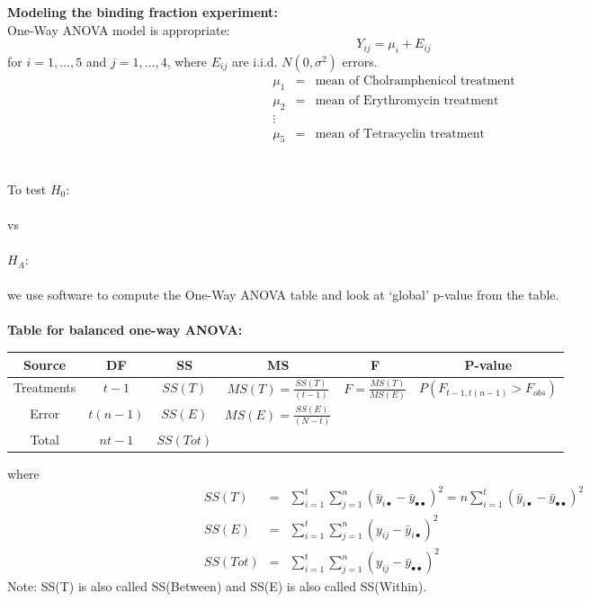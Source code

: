 \textbf{Modeling the binding fraction experiment:}\\
One-Way ANOVA model is appropriate: 
$$Y_{ij} = \mu_i + E_{ij}$$
for $i=1,\ldots,5$ and $j=1,\ldots,4$, where $E_{ij}$ are i.i.d. $N(0,\sigma^2)$ errors.
\begin{eqnarray*}
\mu_1 & = & \mbox{mean of Cholramphenicol treatment}\\
\mu_2 & = & \mbox{mean of Erythromycin treatment}\\
\vdots\\ 
\mu_5 & = & \mbox{mean of Tetracyclin treatment}
\end{eqnarray*}
~\\~\\
To test 
$H_0:$\\~\\ %
vs\\~\\
$H_A:$\\~\\ %
we use software to compute the One-Way ANOVA table and look at `global' p-value from the table.\\~\\
\textbf{Table for balanced one-way ANOVA:}
\begin{center}
\begin{tabular}{|c|c|c|c|c|c|} \hline
Source & DF & SS & MS & F & P-value\\ \hline
Treatments & $t-1$ & $SS(T)$ & $MS(T)=\frac{SS(T)}{(t-1)}$ & $F=\frac{MS(T)}{MS(E)}$ & $P(F_{t-1,t(n-1)}>F_{obs})$\\ 
Error & $t(n-1)$ & $SS(E)$ & $MS(E)=\frac{SS(E)}{(N-t)}$ & &\\
Total & $nt-1$ & $SS(Tot)$ & & &\\ \hline
\end{tabular}
\end{center}
where
\begin{eqnarray*}
SS(T) & = &\sum_{i=1}^{t} \sum_{j=1}^{n} (\bar{y}_{i\bullet} - \bar{y}_{\bullet\bullet})^2 = n\sum_{i=1}^{t}(\bar{y}_{i\bullet} - \bar{y}_{\bullet\bullet})^2\\
SS(E) & = & \sum_{i=1}^{t} \sum_{j=1}^{n}(y_{ij}-\bar{y}_{i\bullet})^2 \\
SS(Tot)&=& \sum_{i=1}^{t} \sum_{j=1}^{n}(y_{ij}-\bar{y}_{\bullet\bullet})^2
\end{eqnarray*}
Note:  SS(T) is also called SS(Between) and SS(E) is also called SS(Within).

